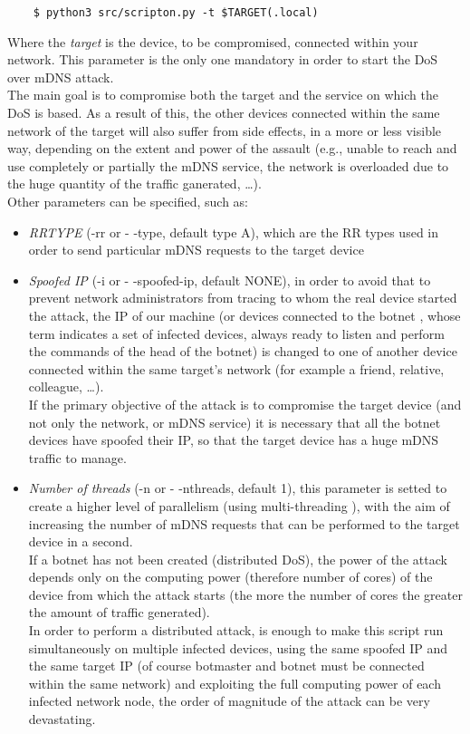 \documentclass[fleqn, 10pt]{SelfArx} %
\begin{document}
\begin{scriptsize}
	\begin{verbatim}
	$ python3 src/scripton.py -t $TARGET(.local) 
	\end{verbatim}
\end{scriptsize}

Where the {\it{target}} is the device, to be compromised, connected within your network.
This parameter is the only one mandatory in order to start the DoS over mDNS attack.\\
The main goal is to compromise both the target and the service on which the DoS is based. 
As a result of this, the other devices connected within the same network of the target will 
also suffer from side effects, in a more or less visible way, depending on the extent and power of the assault
(e.g., unable to reach and use completely or partially the mDNS service, the network is overloaded due to the huge quantity of the traffic ganerated, \dots).\\
Other parameters can be specified, such as:
\begin{itemize}[leftmargin=*]
    \item {\it{RRTYPE}} (-rr or - -type, default type A), which are the RR types used in order to send particular mDNS requests to the target device
    \item {\it{Spoofed IP} \cite{SPOOFING}} (-i or - -spoofed-ip, default NONE), in order to avoid that to prevent network administrators from tracing to whom the real device started the attack, 
	the IP of our machine (or devices connected to the botnet \cite{BOTNET}, whose term indicates a set of infected devices, always ready to listen and perform the commands of the head of the botnet) is changed to one of another device connected within the same target's network (for example a friend, relative, colleague, \dots).\\
	If the primary objective of the attack is to compromise the target device (and not only the network, or mDNS service) it is necessary that all the botnet devices have spoofed their IP, 
	so that the target device has a huge mDNS traffic to manage.
    \item {\it{Number of threads}} (-n or - -nthreads, default 1), this parameter is setted to create a higher level of parallelism (using multi-threading \cite{THREAD}), with the aim of increasing the number of mDNS requests that can be performed to the target device in a second. \\
    If a botnet has not been created (distributed DoS), the power of the attack depends only on the computing power (therefore number of cores) of the device from which the attack starts (the more the number of cores the greater the amount of traffic generated). \\
	In order to perform a distributed attack, is enough to make this script run simultaneously on multiple infected devices, using the same spoofed IP and the same target IP (of course botmaster and botnet must be connected within the same network) and exploiting the full computing power of each infected network node, the order of magnitude of the attack can be very devastating.
\end{itemize}
\end{document}
